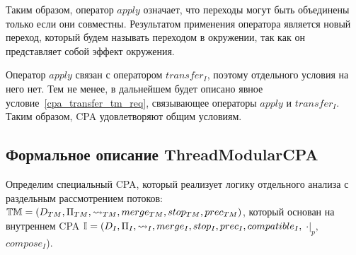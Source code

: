 Таким образом, оператор $apply$ означает, что переходы могут быть объединены только если они совместны. Результатом применения оператора является новый переход, который будем называть переходом в окружении, так как он представляет собой эффект окружения.

Оператор $apply$ связан с оператором $transfer_I$, поэтому отдельного условия на него нет.
Тем не менее, в дальнейшем будет описано явное условие~\ref{cpa_transfer_tm_req}, связывающее операторы $apply$ и $transfer_I$.
Таким образом, CPA удовлетворяют общим условиям.


\subsection{Формальное описание ThreadModularCPA}

Определим специальный CPA, который реализует логику отдельного анализа с раздельным рассмотрением потоков: $\mathbb{TM}=(D_{TM}, \Pi_{TM}, \leadsto_{TM}, merge_{TM}, stop_{TM}, prec_{TM})$, который основан на внутреннем CPA $\mathbb{I}=(D_{I}, \Pi_{I}, \leadsto_{I}, merge_{I}, stop_{I}, prec_{I}, compatible_{I},$ $\cdot|_p,$ $compose_I$).

